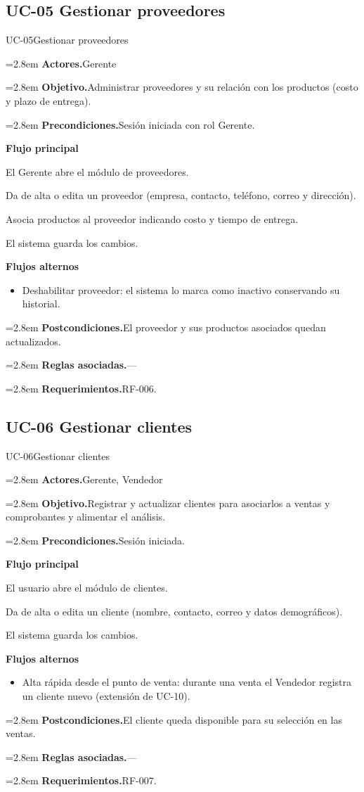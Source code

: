 \documentclass[11pt]{article}
\newcommand{\fila}[2]{\par\smallskip\noindent\hangindent=2.8em\hangafter=0
  \textbf{\sffamily\color{brand!80!black}#1.}\hspace{0.4em}#2\par}
\newcommand{\bloque}[1]{\par\smallskip\noindent\textbf{\sffamily\color{brand!80!black}#1}\par\nopagebreak}
\newenvironment{alternos}{\begin{itemize}[leftmargin=2.9em, itemsep=0.2ex, topsep=0.3ex]}{\end{itemize}}
\begin{document}
\subsection{UC-05 Gestionar proveedores}
\begin{ficha}{UC-05}{Gestionar proveedores}
\fila{Actores}{Gerente}
\fila{Objetivo}{Administrar proveedores y su relación con los productos (costo y plazo de entrega).}
\fila{Precondiciones}{Sesión iniciada con rol Gerente.}
\bloque{Flujo principal}
\begin{pasos}
  \item El Gerente abre el módulo de proveedores.
  \item Da de alta o edita un proveedor (empresa, contacto, teléfono, correo y dirección).
  \item Asocia productos al proveedor indicando costo y tiempo de entrega.
  \item El sistema guarda los cambios.
\end{pasos}
\bloque{Flujos alternos}
\begin{alternos}
  \item[\textbf{2a.}] Deshabilitar proveedor: el sistema lo marca como inactivo conservando su historial.
\end{alternos}
\fila{Postcondiciones}{El proveedor y sus productos asociados quedan actualizados.}
\fila{Reglas asociadas}{---}
\fila{Requerimientos}{RF-006.}
\end{ficha}

\subsection{UC-06 Gestionar clientes}
\begin{ficha}{UC-06}{Gestionar clientes}
\fila{Actores}{Gerente, Vendedor}
\fila{Objetivo}{Registrar y actualizar clientes para asociarlos a ventas y comprobantes y alimentar el análisis.}
\fila{Precondiciones}{Sesión iniciada.}
\bloque{Flujo principal}
\begin{pasos}
  \item El usuario abre el módulo de clientes.
  \item Da de alta o edita un cliente (nombre, contacto, correo y datos demográficos).
  \item El sistema guarda los cambios.
\end{pasos}
\bloque{Flujos alternos}
\begin{alternos}
  \item[\textbf{1a.}] Alta rápida desde el punto de venta: durante una venta el Vendedor registra un cliente nuevo (extensión de UC-10).
\end{alternos}
\fila{Postcondiciones}{El cliente queda disponible para su selección en las ventas.}
\fila{Reglas asociadas}{---}
\fila{Requerimientos}{RF-007.}
\end{ficha}
\end{document}
